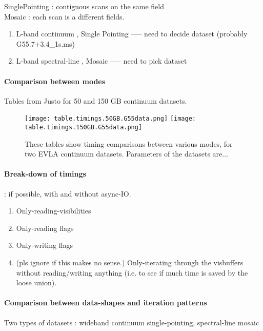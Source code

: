 SinglePointing : contiguous scans on the same field\\
Mosaic  :  each scan is a different fields.\\

\begin{enumerate}
\item \label{dA} L-band continuum , Single Pointing   ----- need to decide dataset (probably G55.7+3.4\_1s.ms)
\item \label{dB} L-band spectral-line , Mosaic            ----- need to pick dataset 

\end{enumerate}


\paragraph{Comparison between modes}
{\green Tables from Justo for 50 and 150 GB continuum datasets. }


\begin{figure}
\texttt{[image: table.timings.50GB.G55data.png]}
\texttt{[image: table.timings.150GB.G55data.png]}
\caption{These tables show timing comparisons between various modes, for two EVLA continuum datasets. Parameters of the datasets are... }
\end{figure}


\paragraph{Break-down of timings} : if possible, with and without async-IO.
\begin{enumerate}
\item  Only-reading-visibilities 
\item  Only-reading flags
\item  Only-writing flags
\item  (pls ignore if this makes no sense.) Only-iterating through the visbuffers without reading/writing anything (i.e. to see if much time is saved by the loose union). 
\end{enumerate}

\paragraph{Comparison between data-shapes and iteration patterns}

Two types of datasets : wideband continuum single-pointing,   spectral-line mosaic



